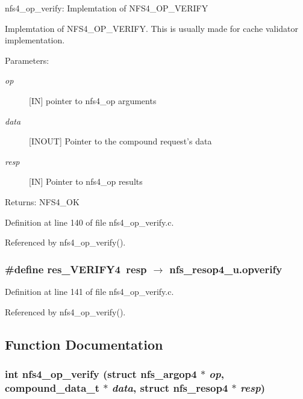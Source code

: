 nfs4\_\-op\_\-verify: Implemtation of NFS4\_\-OP\_\-VERIFY

Implemtation of NFS4\_\-OP\_\-VERIFY. This is usually made for cache validator implementation.

\begin{Desc}
\item[Parameters:]
\begin{description}
\item[{\em op}][IN] pointer to nfs4\_\-op arguments \item[{\em data}][INOUT] Pointer to the compound request's data \item[{\em resp}][IN] Pointer to nfs4\_\-op results\end{description}
\end{Desc}
\begin{Desc}
\item[Returns:]NFS4\_\-OK \end{Desc}


Definition at line 140 of file nfs4\_\-op\_\-verify.c.

Referenced by nfs4\_\-op\_\-verify().
\subsubsection{\setlength{\rightskip}{0pt plus 5cm}\#define res\_\-VERIFY4\ resp $\rightarrow$ nfs\_\-resop4\_\-u.opverify}\label{nfs4__op__verify_8c_a1}




Definition at line 141 of file nfs4\_\-op\_\-verify.c.

Referenced by nfs4\_\-op\_\-verify().

\subsection{Function Documentation}
\subsubsection{\setlength{\rightskip}{0pt plus 5cm}int nfs4\_\-op\_\-verify (struct nfs\_\-argop4 $\ast$ {\em op}, compound\_\-data\_\-t $\ast$ {\em data}, struct nfs\_\-resop4 $\ast$ {\em resp})}\label{nfs4__op__verify_8c_a2}




